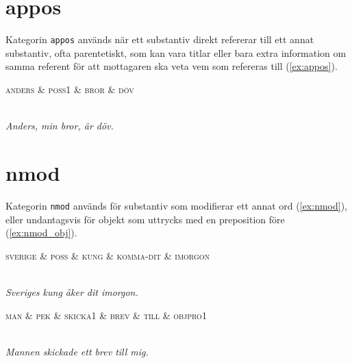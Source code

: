 \documentclass[11pt,a4paper]{article}
\begin{document}
\section{appos}
Kategorin \texttt{appos} används när ett substantiv direkt refererar till ett annat substantiv, ofta parentetiskt, som kan vara titlar eller bara extra information om samma referent för att mottagaren ska veta vem som refereras till (\ref{ex:appos}).

\begin{example}
\label{ex:appos}
\begin{dependency}[theme = simple]
   \begin{deptext}[column sep=1em]
      \textsc{anders} \& \textsc{poss1} \& \textsc{bror} \& \textsc{döv} \\
   \end{deptext}
\end{dependency}
\\
\textit{Anders, min bror, är döv.}
\end{example}

\section{nmod}
\label{sec:nmod}
Kategorin \texttt{nmod} används för substantiv som modifierar ett annat ord (\ref{ex:nmod}), eller undantagsvis för objekt som uttrycks med en preposition före (\ref{ex:nmod_obj}).

\begin{example}
\label{ex:nmod}
\begin{dependency}[theme = simple]
   \begin{deptext}[column sep=1em]
      \textsc{sverige} \& \textsc{poss} \& \textsc{kung} \& \textsc{komma-dit} \& \textsc{imorgon} \\
   \end{deptext}
\end{dependency}
\\
\textit{Sveriges kung åker dit imorgon.}
\end{example}

\begin{example}
\label{ex:nmod_obj}
\begin{dependency}[theme = simple]
   \begin{deptext}[column sep=1em]
      \textsc{man} \& \textsc{pek} \& \textsc{skicka1} \& \textsc{brev} \& \textsc{till} \& \textsc{objpro1} \\
   \end{deptext}
\end{dependency}
\\
\textit{Mannen skickade ett brev till mig.}
\end{example}
\end{document}
